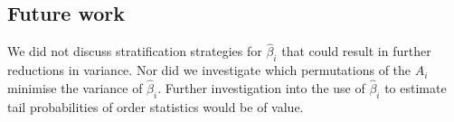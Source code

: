 \subsection{Future work}

We did not discuss stratification strategies for $\hat{\beta}_i$ that could result in further reductions in variance. Nor did we investigate which permutations of the $A_i$ minimise the variance of $\hat{\beta}_i$. Further investigation into the use of $\hat{\beta}_i$ to estimate tail probabilities of order statistics would be of value.


